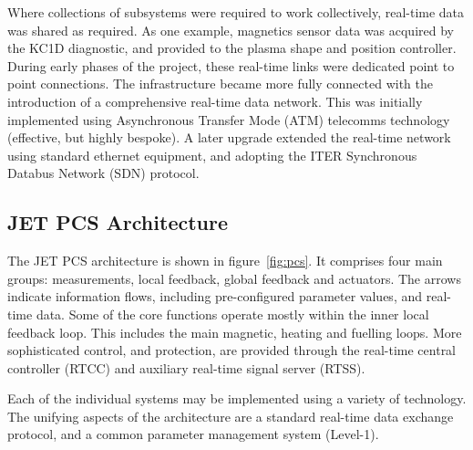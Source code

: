 \documentclass[preprint]{elsarticle}
\begin{document}
Where collections of subsystems were required to work collectively, real-time data was
shared as required. As one example, magnetics sensor data was acquired by the KC1D
diagnostic, and provided to the plasma shape and position controller.  During early
phases of the project, these real-time links were dedicated point to point connections.
The infrastructure became more fully connected with the introduction of a comprehensive
real-time data network.  This was initially implemented using Asynchronous Transfer Mode (ATM)
telecomms technology (effective, but highly bespoke). A later upgrade extended the
real-time network using standard ethernet equipment, and adopting the ITER Synchronous Databus
Network (SDN\cite{boncagniSynchronousDatabusNetwork2008}) protocol.


\subsection{JET PCS Architecture}
\label{l_architecture}

The JET PCS architecture is shown in figure~\ref{fig:pcs}. 
It comprises four main groups: measurements, local feedback, global feedback and actuators.
The arrows indicate information flows, including pre-configured parameter values, and
real-time data.  Some of the core functions operate mostly within the inner local feedback
loop.  This includes the main magnetic, heating and fuelling loops.  More sophisticated
control, and protection, are provided through the real-time central controller (RTCC) 
and auxiliary real-time signal server (RTSS).

Each of the individual systems may be implemented using a variety of technology.
The unifying aspects of the architecture are a standard real-time data exchange
protocol\cite{feltonRealtimeMeasurementControl2005b}, and a common parameter management system (Level-1\cite{vanderbekenLevelSoftwareJET1989}).
\end{document}

